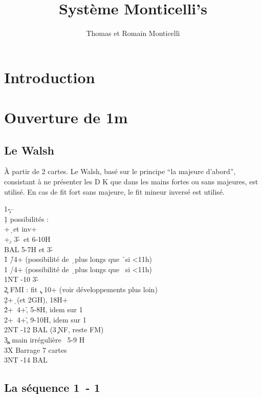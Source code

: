 \documentclass[a4paper]{article}
\title{Système Monticelli's}
\author{Thomas et Romain Monticelli}
\begin{document}
\maketitle
\tableofcontents

\section{Introduction}

\section{Ouverture de 1m}

\subsection{Le Walsh}

À partir de 2 cartes. Le Walsh, basé sur le principe ``la majeure d'abord'', consistant à ne présenter les D
K que dans les mains fortes ou sans majeures, est utilisé.
En cas de fit fort sans majeure, le fit mineur inversé est utilisé.

\begin{bidtable}
1\c---\\
1\d {} possibilités :\\
+\d\ et inv+\\
+\d , 3-\h \s\ et 6-10H\\
\>BAL 5-7H et 3-\h \s \\
1\h \> \h /4+ (possibilité de \d\ plus longs que \h\ si <11h)\\
1\s \> \s /4+ (possibilité de \d\ plus longs que \s\ si <11h)\\
1NT -10 3-\h \s \\
2\c \> FMI : fit \c , 10+ (voir développements plus loin)\\
2\d {}+\d\ (et 2GH), 18H+\\
2\h {}+\s\ 4+\h , 5-8H, idem sur 1\d \\
2\s {}+\s\ 4+\h , 9-10H, idem sur 1\d \\
2NT	 -12 BAL (3\c\ NF, reste FM)\\
3\c	 {}\c , main irrégulière ~5-9 H\\
3X	 \> Barrage 7 cartes\\
3NT	 -14 BAL
\end{bidtable}

\subsection{La séquence 1\pdfc\ - 1\pdfd}
\end{document}
